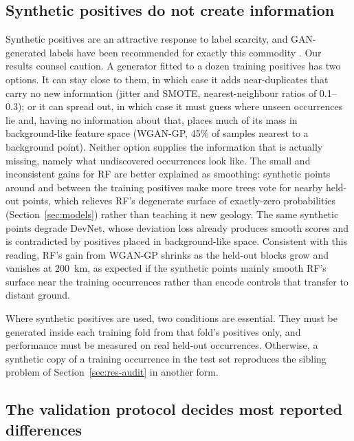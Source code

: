 \documentclass[pdflatex,sn-apa]{sn-jnl}
\begin{document}
\subsection{Synthetic positives do not create information}\label{sec:disc-gan}

Synthetic positives are an attractive response to label scarcity, and GAN-generated labels have been recommended for exactly this commodity \citep{Parsa2025}. Our results counsel caution. A generator fitted to a dozen training positives has two options. It can stay close to them, in which case it adds near-duplicates that carry no new information (jitter and SMOTE, nearest-neighbour ratios of 0.1--0.3); or it can spread out, in which case it must guess where unseen occurrences lie and, having no information about that, places much of its mass in background-like feature space (WGAN-GP, 45\% of samples nearest to a background point). Neither option supplies the information that is actually missing, namely what undiscovered occurrences look like. The small and inconsistent gains for RF are better explained as smoothing: synthetic points around and between the training positives make more trees vote for nearby held-out points, which relieves RF's degenerate surface of exactly-zero probabilities (Section~\ref{sec:models}) rather than teaching it new geology. The same synthetic points degrade DevNet, whose deviation loss already produces smooth scores and is contradicted by positives placed in background-like space. Consistent with this reading, RF's gain from WGAN-GP shrinks as the held-out blocks grow and vanishes at 200~km, as expected if the synthetic points mainly smooth RF's surface near the training occurrences rather than encode controls that transfer to distant ground.

Where synthetic positives are used, two conditions are essential. They must be generated inside each training fold from that fold's positives only, and performance must be measured on real held-out occurrences. Otherwise, a synthetic copy of a training occurrence in the test set reproduces the sibling problem of Section~\ref{sec:res-audit} in another form.

\subsection{The validation protocol decides most reported differences}\label{sec:disc-protocol}
\end{document}
